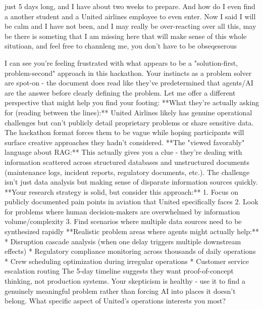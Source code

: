 \begin{userprompt}
just 5 days long, and I have about two weeks to prepare. And how do I even find a another student and a United airlines employee to even enter. Now I said I will be calm and I have not been, and I may really be over-reacting over all this, may be there is someting that I am missing here that will make sense of this whole situtioan, and feel free to channleng me, you don't have to be obseqeserous
\end{userprompt}

\begin{botresponse}
I can see you're feeling frustrated with what appears to be a "solution-first, problem-second" approach in this hackathon. Your instincts as a problem solver are spot-on - the document does read like they've predetermined that agents/AI are the answer before clearly defining the problem.
Let me offer a different perspective that might help you find your footing:
**What they're actually asking for (reading between the lines):** United Airlines likely has genuine operational challenges but can't publicly detail proprietary problems or share sensitive data. The hackathon format forces them to be vague while hoping participants will surface creative approaches they hadn't considered.
**The "viewed favorably" language about RAG:** This actually gives you a clue - they're dealing with information scattered across structured databases and unstructured documents (maintenance logs, incident reports, regulatory documents, etc.). The challenge isn't just data analysis but making sense of disparate information sources quickly.
**Your research strategy is solid, but consider this approach:**
1.  Focus on publicly documented pain points in aviation that United specifically faces
2.  Look for problems where human decision-makers are overwhelmed by information volume/complexity
3.  Find scenarios where multiple data sources need to be synthesized rapidly
**Realistic problem areas where agents might actually help:**
*   Disruption cascade analysis (when one delay triggers multiple downstream effects)
*   Regulatory compliance monitoring across thousands of daily operations
*   Crew scheduling optimization during irregular operations
*   Customer service escalation routing
The 5-day timeline suggests they want proof-of-concept thinking, not production systems. Your skepticism is healthy - use it to find a genuinely meaningful problem rather than forcing AI into places it doesn't belong.
What specific aspect of United's operations interests you most?
\end{botresponse}

